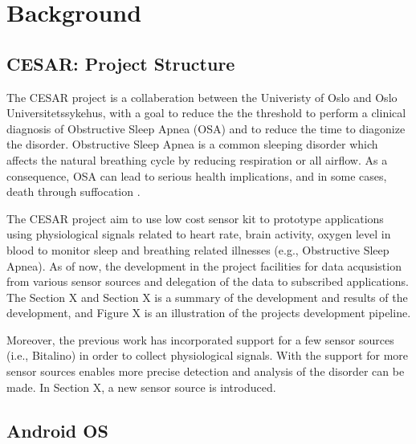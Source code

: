 \chapter{Background}

\section{CESAR: Project Structure}
The CESAR project is a collaberation between the Univeristy of Oslo and Oslo Universitetssykehus, with a goal to reduce the the threshold to perform a clinical diagnosis of Obstructive Sleep Apnea (OSA) and to reduce the time to diagonize the disorder. Obstructive Sleep Apnea is a common sleeping disorder which affects the natural breathing cycle by reducing respiration or all airflow. As a consequence, OSA can lead to serious health implications, and in some cases, death through suffocation \cite{cesarinfo}. 

The CESAR project aim to use low cost sensor kit to prototype applications using physiological signals related to heart rate, brain activity, oxygen level in blood to monitor sleep and breathing related illnesses (e.g., Obstructive Sleep Apnea). As of now, the development in the project facilities for data acqusistion from various sensor sources and delegation of the data to subscribed applications. The Section X and Section X is a summary of the development and results of the development, and Figure X is an illustration of the projects development pipeline. 

Moreover, the previous work has incorporated support for a few sensor sources (i.e., Bitalino) in order to collect physiological signals. With the support for more sensor sources enables more precise detection and analysis of the disorder can be made. In Section X, a new sensor source is introduced. 





\section{Android OS}

